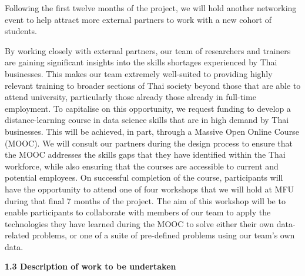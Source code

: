 \documentclass[11pt]{article}
\begin{document}
  Following the first twelve months of the project, we will hold another networking event to help attract more external partners to work with a new cohort of students.
  
  \vspace{2mm}
  \noindent
  By working closely with external partners, our team of researchers and trainers are gaining significant insights into the skills shortages experienced by Thai businesses. This makes our team extremely well-suited to providing highly relevant training to broader sections of Thai society beyond those that are able to attend university, particularly those already those already in full-time employment. To capitalise on this opportunity, we request funding to develop a distance-learning course in data science skills that are in high demand by Thai businesses. This will be achieved, in part, through a Massive Open Online Course (MOOC). We will consult our partners during the design process to ensure that the MOOC addresses the skills gaps that they have identified within the Thai workforce, while also ensuring that the courses are accessible to current and potential employees. On successful completion of the course, participants will have the opportunity to attend one of four workshops that we will hold at MFU during that final 7 months of the project. The aim of this workshop will be to enable participants to collaborate with members of our team to apply the technologies they have learned during the MOOC to solve either their own data-related problems, or one of a suite of pre-defined problems using our team's own data.
  
  \vspace{2mm}
  \noindent
  {\large \bf 1.3 Description of work to be undertaken}
    
\end{document}
